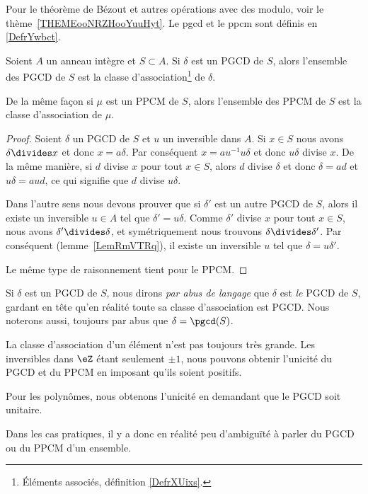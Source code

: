 Pour le théorème de Bézout et autres opérations avec des modulo, voir le thème~\ref{THEMEooNRZHooYuuHyt}. Le pgcd et le ppcm sont définis en \ref{DefrYwbct}.

\begin{lemma}		\label{LEMooGWKMooLEepxz}
	Soient \( A\) un anneau intègre et \( S\subset A\). Si \( \delta\) est un PGCD de \( S\), alors l'ensemble des PGCD de \( S\) est la classe d'association\footnote{Éléments associés, définition \ref{DefrXUixs}.} de \( \delta\).

	De la même façon si \( \mu\) est un PPCM de \( S\), alors l'ensemble des PPCM de \( S\) est la classe d'association de \( \mu\).
\end{lemma}

\begin{proof}
	Soient \( \delta\) un PGCD de \( S\) et \( u\) un inversible dans \( A\). Si \( x\in S\) nous avons \( \delta\divides x\) et donc \( x=a\delta\). Par conséquent \( x=au^{-1}u\delta\) et donc \( u\delta\) divise \( x\). De la même manière, si \( d\) divise \( x\) pour tout \( x\in S\), alors \( d\) divise \( \delta\) et donc \( \delta=ad\) et \( u\delta=aud\), ce qui signifie que \( d\) divise \( u\delta\).

	Dans l'autre sens nous devons prouver que si \( \delta'\) est un autre PGCD de \( S\), alors il existe un inversible \( u\in A\) tel que \( \delta'=u\delta\). Comme \( \delta'\) divise \( x\) pour tout \( x\in S\), nous avons \( \delta'\divides \delta\), et symétriquement nous trouvons \( \delta\divides\delta'\). Par conséquent (lemme~\ref{LemRmVTRq}), il existe un inversible \( u\) tel que \( \delta=u\delta'\).

	Le même type de raisonnement tient pour le PPCM.
\end{proof}

Si \( \delta\) est un PGCD de \( S\), nous dirons \emph{par abus de langage} que \( \delta\) est \emph{le} PGCD de \( S\), gardant en tête qu'en réalité toute sa classe d'association est PGCD. Nous noterons aussi, toujours par abus que \( \delta=\pgcd(S)\).

\begin{remark}
	La classe d'association d'un élément n'est pas toujours très grande. Les inversibles dans \( \eZ\) étant seulement \( \pm 1\), nous pouvons obtenir l'unicité du PGCD et du PPCM en imposant qu'ils soient positifs.

	Pour les polynômes, nous obtenons l'unicité en demandant que le PGCD soit unitaire.

	Dans les cas pratiques, il y a donc en réalité peu d'ambiguïté à parler du PGCD ou du PPCM d'un ensemble.
\end{remark}


